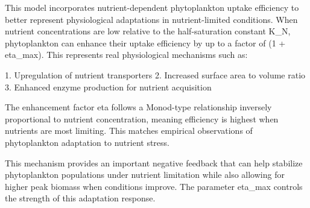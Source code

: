 This model incorporates nutrient-dependent phytoplankton uptake efficiency to better represent physiological adaptations in nutrient-limited conditions. When nutrient concentrations are low relative to the half-saturation constant K_N, phytoplankton can enhance their uptake efficiency by up to a factor of (1 + eta_max). This represents real physiological mechanisms such as:

1. Upregulation of nutrient transporters
2. Increased surface area to volume ratio
3. Enhanced enzyme production for nutrient acquisition

The enhancement factor eta follows a Monod-type relationship inversely proportional to nutrient concentration, meaning efficiency is highest when nutrients are most limiting. This matches empirical observations of phytoplankton adaptation to nutrient stress.

This mechanism provides an important negative feedback that can help stabilize phytoplankton populations under nutrient limitation while also allowing for higher peak biomass when conditions improve. The parameter eta_max controls the strength of this adaptation response.
